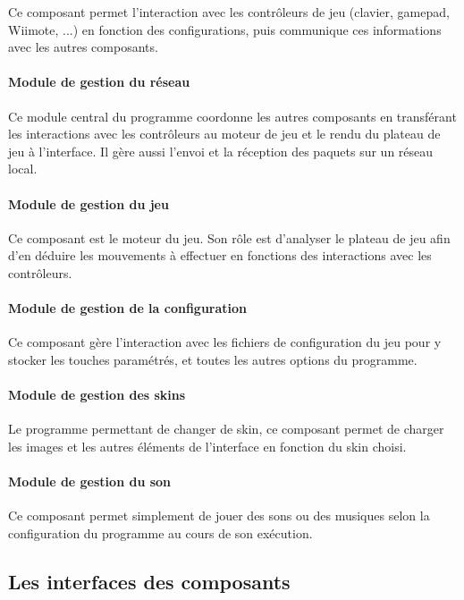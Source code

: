 Ce composant permet l'interaction avec les contrôleurs de jeu (clavier, gamepad, Wiimote, ...) en fonction des configurations, puis communique ces informations avec les autres composants.

\paragraph{Module de gestion du réseau}

Ce module central du programme coordonne les autres composants en transférant les interactions avec les contrôleurs au moteur de jeu et le rendu du plateau de jeu à l'interface. Il gère aussi l'envoi et la réception des paquets sur un réseau local.

\paragraph{Module de gestion du jeu}

Ce composant est le moteur du jeu. Son rôle est d'analyser le plateau de jeu afin d'en déduire les mouvements à effectuer en fonctions des interactions avec les contrôleurs.

\paragraph{Module de gestion de la configuration}

Ce composant gère l'interaction avec les fichiers de configuration du jeu pour y stocker les touches paramétrés, et toutes les autres options du programme.

\paragraph{Module de gestion des skins}

Le programme permettant de changer de skin, ce composant permet de charger les images et les autres éléments de l'interface en fonction du skin choisi.

\paragraph{Module de gestion du son}

Ce composant permet simplement de jouer des sons ou des musiques selon la configuration du programme au cours de son exécution.

\subsection{Les interfaces des composants}

